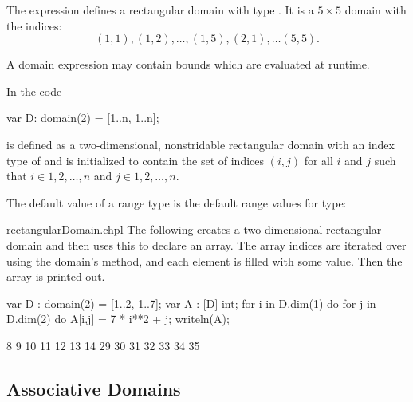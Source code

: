 \begin{example}
The expression \chpl{[1..5, 1..5]} defines a rectangular domain with
type   .
It is a $5 \times 5$ domain with the indices:
\begin{equation}
(1, 1), (1, 2), \ldots, (1, 5), (2, 1), \ldots (5, 5).
\end{equation}
\end{example}

A domain expression may contain bounds which are evaluated at runtime.
\begin{example}
In the code
\begin{chapel}
var D: domain(2) = [1..n, 1..n];
\end{chapel}

 is defined as a two-dimensional, nonstridable rectangular
domain with an index type of  and is initialized to
contain the set of indices $(i,j)$ for all $i$ and $j$ such that
$i \in {1, 2, \ldots, n}$ and $j \in {1, 2, \ldots, n}$.
\end{example}


The default value of a range type is the  default range
values for type:
\begin{quote}
\end{quote}

\begin{chapelexample}{rectangularDomain.chpl}
The following creates a two-dimensional rectangular domain and then uses this to
declare an array.  The array indices are iterated over using the domain's
 method, and each element is filled with
some value.  Then the array is printed out.
\begin{chapel}
var D : domain(2) = [1..2, 1..7];
var A : [D] int;
for i in D.dim(1) do
  for j in D.dim(2) do
    A[i,j] = 7 * i**2 + j;
writeln(A);
\end{chapel}
\begin{chapelprintoutput}
8 9 10 11 12 13 14
29 30 31 32 33 34 35
\end{chapelprintoutput}
\end{chapelexample}

\subsection{Associative Domains}

